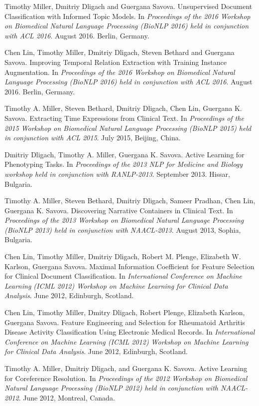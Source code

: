 \documentclass[letterpaper]{article}
\renewenvironment{itemize}{
  \begin{list}{}{
    \setlength{\leftmargin}{1.5em}
  }
}{
  \end{list}
}
\begin{document}
\begin{itemize}
\item Timothy Miller, Dmitriy Dligach and Guergana Savova. Unsupervised Document Classification with Informed Topic Models. In \emph{Proceedings of the 2016 Workshop on Biomedical Natural Language Processing (BioNLP 2016) held in conjunction with ACL 2016}. August 2016. Berlin, Germany.
\item Chen Lin, Timothy Miller, Dmitriy Dligach, Steven Bethard and Guergana Savova. Improving Temporal Relation Extraction with Training Instance Augmentation. In \emph{Proceedings of the 2016 Workshop on Biomedical Natural Language Processing (BioNLP 2016) held in conjunction with ACL 2016}. August 2016. Berlin, Germany.
\item Timothy A. Miller, Steven Bethard, Dmitriy Dligach, Chen Lin, Guergana K. Savova. Extracting Time Expressions from Clinical Text. In \emph{Proceedings of the 2015 Workshop on Biomedical Natural Language Processing (BioNLP 2015) held in conjunction with ACL 2015}. July 2015, Beijing, China.
\item Dmitriy Dligach, Timothy A. Miller, Guergana K. Savova. Active Learning for Phenotyping Tasks. In \emph{Proceedings of the 2013 NLP for Medicine and Biology workshop held in conjunction with RANLP-2013}. September 2013. Hissar, Bulgaria.
\item Timothy A. Miller, Steven Bethard, Dmitriy Dligach, Sameer Pradhan, Chen Lin, Guergana K. Savova. Discovering Narrative Containers in Clinical Text. In \emph{Proceedings of the 2013 Workshop on Biomedical Natural Language Processing (BioNLP 2013) held in conjunction with NAACL-2013}. August 2013, Sophia, Bulgaria.
\item Chen Lin, Timothy Miller, Dmitriy Dligach, Robert M. Plenge, Elizabeth W. Karlson, Guergana Savova. Maximal Information Coefficient for Feature Selection for Clinical Document Classification. In \emph{International Conference on Machine Learning (ICML 2012) Workshop on Machine Learning for Clinical Data Analysis}. June 2012, Edinburgh, Scotland.
\item Chen Lin, Timothy Miller, Dmitry Dligach, Robert Plenge, Elizabeth Karlson, Guergana Savova. Feature Engineering and Selection for Rheumatoid Arthritis Disease Activity Classification Using Electronic Medical Records. In \emph{International Conference on Machine Learning (ICML 2012) Workshop on Machine Learning for Clinical Data Analysis}. June 2012, Edinburgh, Scotland.
\item Timothy A. Miller, Dmitriy Dligach, and Guergana K. Savova. Active Learning for Coreference Resolution. In \emph{Proceedings of the 2012 Workshop on Biomedical Natural Language Processing (BioNLP 2012) held in conjunction with NAACL-2012}. June 2012, Montreal, Canada.

\end{itemize}
\end{document}
